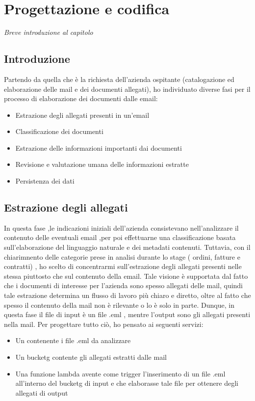 \chapter{Progettazione e codifica}
\label{cap:progettazione-codifica}

\emph{Breve introduzione al capitolo}

\section{Introduzione}

Partendo da quella che è la richiesta dell'azienda ospitante (catalogazione ed elaborazione delle mail e dei documenti allegati), ho individuato diverse fasi per il processo di elaborazione dei documenti dalle email: 
\begin{itemize}
  \item Estrazione degli allegati presenti in un'email
  \item Classificazione dei documenti
  \item Estrazione delle informazioni importanti dai documenti
  \item  Revisione e valutazione umana delle informazioni estratte
  \item Persistenza dei dati
\end{itemize}

\section{Estrazione degli allegati}
\label{sec:estrazione-allegati}
In questa fase ,le indicazioni iniziali dell'azienda consistevano nell'analizzare il contenuto delle eventuali  email ,per poi effettuarne una classificazione basata sull'elaborazione del linguaggio naturale e dei metadati contenuti. Tuttavia, con il chiarimnento delle categorie prese in analisi durante lo stage ( ordini, fatture e contratti) , ho scelto di concentrarmi sull'estrazione degli allegati presenti nelle stessa piuttosto che sul contenuto della email. 
Tale visione è supportata dal fatto che i documenti di interesse per l'azienda sono spesso allegati delle mail, quindi  tale estrazione determina un flusso di lavoro più chiaro e diretto, oltre al fatto che spesso il contenuto della mail non è rilevante o lo è solo in parte.
Dunque, in questa fase il file di input è un file .eml , mentre l'output sono gli allegati presenti nella mail. Per progettare tutto ciò, ho pensato ai seguenti servizi:
\begin{itemize}
    \item Un  contenente i file .eml da analizzare
    \item Un \gls{bucketg} contente gli allegati estratti dalle mail 
    \item Una funzione lambda avente come trigger l'inserimento di un file .eml all'interno del \gls{bucketg} di input e che elaborasse tale file per ottenere degli allegati di output
\end{itemize}

